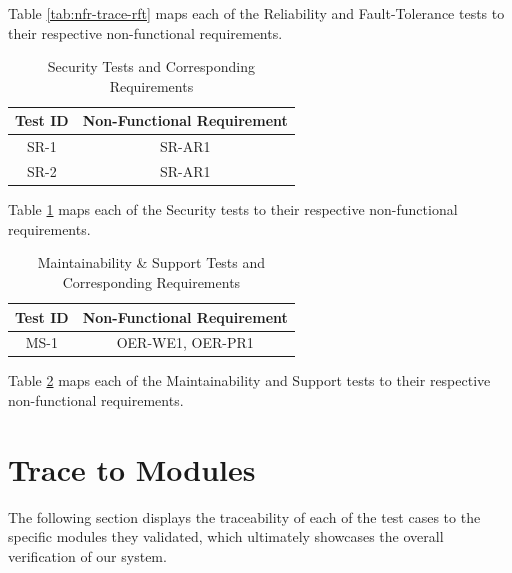 \documentclass[12pt, titlepage]{article}
\begin{document}
Table \ref{tab:nfr-trace-rft} maps each of the Reliability and Fault-Tolerance tests to their 
respective non-functional requirements.

\begin{table}[H]
  \centering
  \caption{Security Tests and Corresponding Requirements}
  \begin{tabular}{cc}
    \toprule \textbf{Test ID} & \textbf{Non-Functional Requirement} \\
    \midrule
    SR-1 & SR-AR1 \\
    SR-2 & SR-AR1 \\
    \bottomrule
  \end{tabular}
  \label{tab:nfr-trace-sec}
\end{table}

Table \ref{tab:nfr-trace-sec} maps each of the Security tests to their 
respective non-functional requirements.

\begin{table}[H]
  \centering
  \caption{Maintainability \& Support Tests and Corresponding Requirements}
  \begin{tabular}{cc}
    \toprule \textbf{Test ID} & \textbf{Non-Functional Requirement} \\
    \midrule
    MS-1 & OER-WE1, OER-PR1 \\
    \bottomrule
  \end{tabular}
  \label{tab:nfr-trace-ms}
\end{table}

Table \ref{tab:nfr-trace-ms} maps each of the Maintainability and Support tests to their 
respective non-functional requirements.

\section{Trace to Modules}	

The following section displays the traceability of each of the test cases to the specific modules they validated, 
which ultimately showcases the overall verification of our system.
\end{document}
